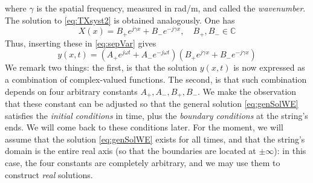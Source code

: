 \documentclass[11pt,twoside,a4paper,english]{book}
\begin{document}
where $\gamma$ is the spatial frequency, measured in rad/m, and called the \emph{wavenumber}. 
The solution to \eqref{eq:TXsyst2} is obtained analogously. One has
\begin{equation}
X(x) = B_+ e^{j\gamma x} + B_- e^{-j\gamma x}, \quad B_+,B_- \in \mathbb{C}
\end{equation}
Thus, inserting these in \eqref{eq:sepVar} gives
\begin{equation}\label{eq:genSolWE}
y(x,t) = \left( A_+ e^{j\omega t} + A_- e^{-j\omega t}\right)\left( B_+ e^{j\gamma x} + B_- e^{-j\gamma x}\right) 
\end{equation}
We remark two things: the first, is that the solution $y(x,t)$ is now expressed as a combination of complex-valued functions. The second, is that such combination depends on four arbitrary constants $A_+,A_-,B_+,B_-$. We make the observation that these constant can be adjusted so that the general solution \eqref{eq:genSolWE} satisfies the \emph{initial conditions} in time, plus the \emph{boundary conditions} at the string's ends. We will come back to these conditions later. For the moment, we will assume that the solution  \eqref{eq:genSolWE} exists for all times, and that the string's domain is the entire real axis (so that the boundaries are located at $\pm \infty$): in this case, the four constants are completely arbitrary, and we may use them to construct \emph{real} solutions. 
\end{document}
